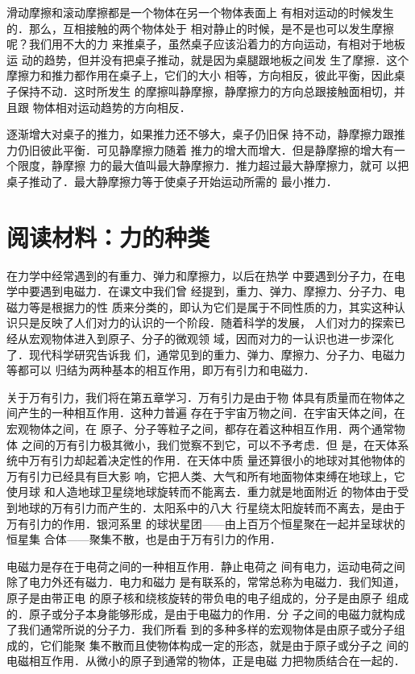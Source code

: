     滑动摩擦和滚动摩擦都是一个物体在另一个物体表面上
有相对运动的时候发生的．那么，互相接触的两个物体处于
相对静止的时候，是不是也可以发生摩擦呢？我们用不大的力
来推桌子，虽然桌子应该沿着力的方向运动，有相对于地板运
动的趋势，但并没有把桌子推动，就是因为桌腿跟地板之间发
生了摩擦．这个摩擦力和推力都作用在桌子上，它们的大小
相等，方向相反，彼此平衡，因此桌子保持不动．这时所发生
的摩擦叫静摩擦，静摩擦力的方向总跟接触面相切，并且跟
物体相对运动趋势的方向相反．

    逐渐增大对桌子的推力，如果推力还不够大，桌子仍旧保
持不动，静摩擦力跟推力仍旧彼此平衡．可见静摩擦力随着
推力的增大而增大．但是静摩擦的增大有一个限度，静摩擦
力的最大值叫最大静摩擦力．推力超过最大静摩擦力，就可
以把桌子推动了．最大静摩擦力等于使桌子开始运动所需的
最小推力．


\section*{阅读材料：力的种类} 
    在力学中经常遇到的有重力、弹力和摩擦力，以后在热学
中要遇到分子力，在电学中要遇到电磁力．在课文中我们曾
经提到，重力、弹力、摩擦力、分子力、电磁力等是根据力的性
质来分类的，即认为它们是属于不同性质的力，其实这种认
识只是反映了人们对力的认识的一个阶段．随着科学的发展，
人们对力的探索已经从宏观物体进入到原子、分子的微观领
域，因而对力的一认识也进一步深化了．现代科学研究告诉我
们，通常见到的重力、弹力、摩擦力、分子力、电磁力等都可以
归结为两种基本的相互作用，即万有引力和电磁力．

    关于万有引力，我们将在第五章学习．万有引力是由于物
体具有质量而在物体之间产生的一种相互作用．这种力普遍
存在于宇宙万物之间．在宇宙天体之间，在宏观物体之间，在
原子、分子等粒子之间，都存在着这种相互作用．两个通常物体
之间的万有引力极其微小，我们觉察不到它，可以不予考虑．但
是，在天体系统中万有引力却起着决定性的作用．在天体中质
量还算很小的地球对其他物体的万有引力已经具有巨大影
响，它把人类、大气和所有地面物体束缚在地球上，它使月球
和人造地球卫星绕地球旋转而不能离去．重力就是地面附近
的物体由于受到地球的万有引力而产生的．太阳系中的八大
行星绕太阳旋转而不离去，是由于万有引力的作用．银河系里
的球状星团——由上百万个恒星聚在一起并呈球状的恒星集
合体——聚集不散，也是由于万有引力的作用．

    电磁力是存在于电荷之间的一种相互作用．静止电荷之
间有电力，运动电荷之间除了电力外还有磁力．电力和磁力
是有联系的，常常总称为电磁力．我们知道，原子是由带正电
的原子核和绕核旋转的带负电的电子组成的，分子是由原子
组成的．原子或分子本身能够形成，是由于电磁力的作用．分
子之间的电磁力就构成了我们通常所说的分子力．我们所看
到的多种多样的宏观物体是由原子或分子组成的，它们能聚
集不散而且使物体构成一定的形态，就是由于原子或分子之
间的电磁相互作用．从微小的原子到通常的物体，正是电磁
力把物质结合在一起的．

